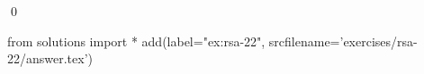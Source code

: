 
\begin{ex} 
  \label{ex:rsa-22}
  
  \qed
\end{ex} 
\begin{python0}
from solutions import *
add(label="ex:rsa-22",
    srcfilename='exercises/rsa-22/answer.tex') 
\end{python0}
